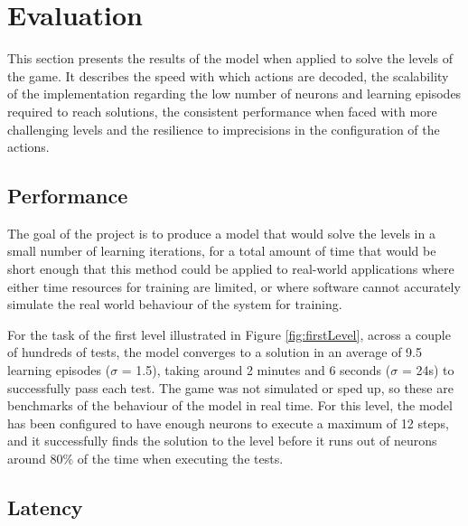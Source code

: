 \documentclass[10pt]{article}
\begin{document}
    \section{Evaluation}

    This section presents the results of the model when applied to solve the levels of the game. It describes the speed with which actions are decoded, the scalability of the implementation regarding the low number of neurons and learning episodes required to reach solutions, the consistent performance when faced with more challenging levels and the resilience to imprecisions in the configuration of the actions.

    \subsection{Performance}
    
    The goal of the project is to produce a model that would solve the levels in a small number of learning iterations, for a total amount of time that would be short enough that this method could be applied to real-world applications where either time resources for training are limited, or where software cannot accurately simulate the real world behaviour of the system for training.

    For the task of the first level illustrated in Figure \ref{fig:firstLevel}, across a couple of hundreds of tests, the model converges to a solution in an average of 9.5 learning episodes ($\sigma$ = 1.5), taking around 2 minutes and 6 seconds ($\sigma$ = 24s) to successfully pass each test. The game was not simulated or sped up, so these are benchmarks of the behaviour of the model in real time. For this level, the model has been configured to have enough neurons to execute a maximum of 12 steps, and it successfully finds the solution to the level before it runs out of neurons around 80\% of the time when executing the tests.

    \subsection{Latency}
\end{document}
